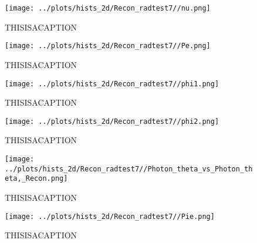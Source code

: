 \documentclass{article}
\begin{document}
\begin{landscape}
    \begin{figure}[ht]
        \centering

        \texttt{[image: ../plots/hists\_2d/Recon\_radtest7//nu.png]}
        \captionsetup{textformat=empty,labelformat=blank}
        \caption{THISISACAPTION}
    \end{figure}
    \clearpage
    
    \begin{figure}[ht]
        \centering

        \texttt{[image: ../plots/hists\_2d/Recon\_radtest7//Pe.png]}
        \captionsetup{textformat=empty,labelformat=blank}
        \caption{THISISACAPTION}
    \end{figure}
    \clearpage
    
    \begin{figure}[ht]
        \centering

        \texttt{[image: ../plots/hists\_2d/Recon\_radtest7//phi1.png]}
        \captionsetup{textformat=empty,labelformat=blank}
        \caption{THISISACAPTION}
    \end{figure}
    \clearpage
    
    \begin{figure}[ht]
        \centering

        \texttt{[image: ../plots/hists\_2d/Recon\_radtest7//phi2.png]}
        \captionsetup{textformat=empty,labelformat=blank}
        \caption{THISISACAPTION}
    \end{figure}
    \clearpage
    
    \begin{figure}[ht]
        \centering

        \texttt{[image: ../plots/hists\_2d/Recon\_radtest7//Photon\_theta\_vs\_Photon\_theta,\_Recon.png]}
        \captionsetup{textformat=empty,labelformat=blank}
        \caption{THISISACAPTION}
    \end{figure}
    \clearpage
    
    \begin{figure}[ht]
        \centering

        \texttt{[image: ../plots/hists\_2d/Recon\_radtest7//Pie.png]}
        \captionsetup{textformat=empty,labelformat=blank}
        \caption{THISISACAPTION}
    \end{figure}
    \clearpage
    
    \begin{figure}[ht]
        \centering


\end{figure}
\end{landscape}
\end{document}
